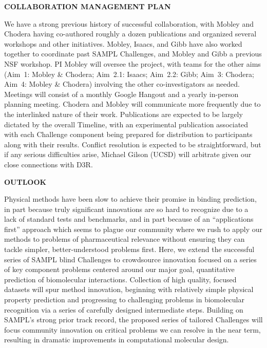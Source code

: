 \documentclass[11pt]{article}
\begin{document}

{\Large \bf COLLABORATION MANAGEMENT PLAN}

We have a strong previous history of successful collaboration, with Mobley and Chodera having co-authored roughly a dozen publications and organized several workshops and other initiatives.
Mobley, Isaacs, and Gibb have also worked together to coordinate past SAMPL Challenges, and Mobley and Gibb a previous NSF workshop. 
PI Mobley will oversee the project, with teams for the other aims (Aim~1: Mobley \& Chodera; Aim~2.1: Isaacs; Aim~2.2: Gibb; Aim~3: Chodera; Aim~4: Mobley \& Chodera) involving the other co-investigators as needed.
Meetings will consist of a monthly Google Hangout and a yearly in-person planning meeting. 
Chodera and Mobley will communicate more frequently due to the interlinked nature of their work.
Publications are expected to be largely dictated by the overall Timeline, with an experimental publication associated with each Challenge component being prepared for distribution to participants along with their results.
Conflict resolution is expected to be straightforward, but if any serious difficulties arise, Michael Gilson (UCSD) will arbitrate given our close connections with D3R.

{\Large \bf OUTLOOK}

Physical methods have been slow to achieve their promise in binding prediction, in part because truly significant innovations are so hard to recognize due to a lack of standard tests and benchmarks, and in part because of an ``applications first'' approach which seems to plague our community where we rush to apply our methods to problems of pharmaceutical relevance without ensuring they can tackle simpler, better-understood problems first.
Here, we extend the successful series of SAMPL blind Challenges to crowdsource innovation focused on a series of key component problems centered around our major goal, quantitative prediction of biomolecular interactions. 
Collection of high quality, focused datasets will spur method innovation, beginning with relatively simple physical property prediction and progressing to challenging problems in biomolecular recognition via a series of carefully designed intermediate steps.
Building on SAMPL's strong prior track record, the proposed series of tailored Challenges will focus community innovation on critical problems we can resolve in the near term, resulting in dramatic improvements in computational molecular design.
\end{document}
